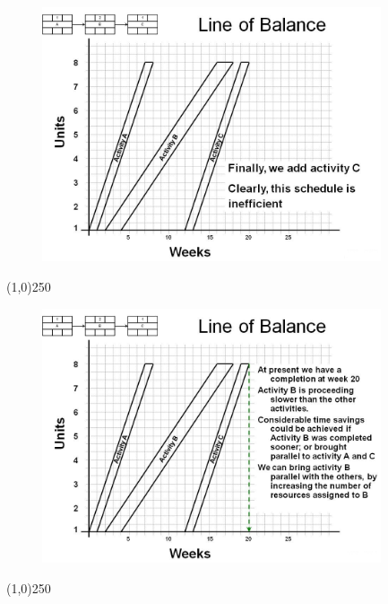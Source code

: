 \begin{frame}
\begin{figure}
	\centering
		\includegraphics[width = 10.0cm]{oldnotes/Slide250.jpg}
\end{figure}
\end{frame}
\begin{center}\line(1,0){250}\end{center}






\begin{frame}
\begin{figure}
	\centering
		\includegraphics[width = 10.0cm]{oldnotes/Slide251.jpg}
\end{figure}
\end{frame}
\begin{center}\line(1,0){250}\end{center}






